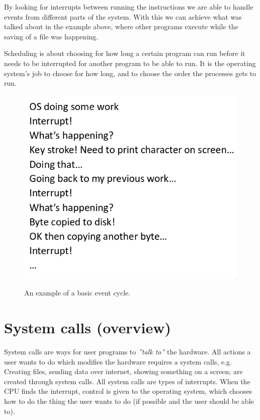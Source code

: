 \begin{minipage}{0.65\textwidth}
	By looking for interrupts between running the instructions we are able to handle events from different parts of the system. With this we can achieve what was talked about in the example above, where other programs execute while the saving of a file was happening.

	Scheduling is about choosing for how long a certain program can run before it needs to be interrupted for another program to be able to run. It is the operating system's job to choose for how long, and to choose the order the processes gets to run.
\end{minipage}
\begin{minipage}{0.3\textwidth}


	\begin{figure}[H]
		\includegraphics[width=1\textwidth]{images/os_event_cycle.png}
		\label{fig:os_event_cycle}
		\caption{An example of a basic event cycle.}
	\end{figure}
\end{minipage}

\section{System calls (overview)}
System calls are ways for user programs to \textit{''talk to''} the hardware. All actions a user wants to do which modifies the hardware requires a system calls, e.g. Creating files, sending data over internet, showing something on a screen; are created through system calls. All system calls are types of interrupts. When the CPU finds the interrupt, control is given to the operating system, which chooses how to do the thing the user wants to do (if possible and the user should be able to).

